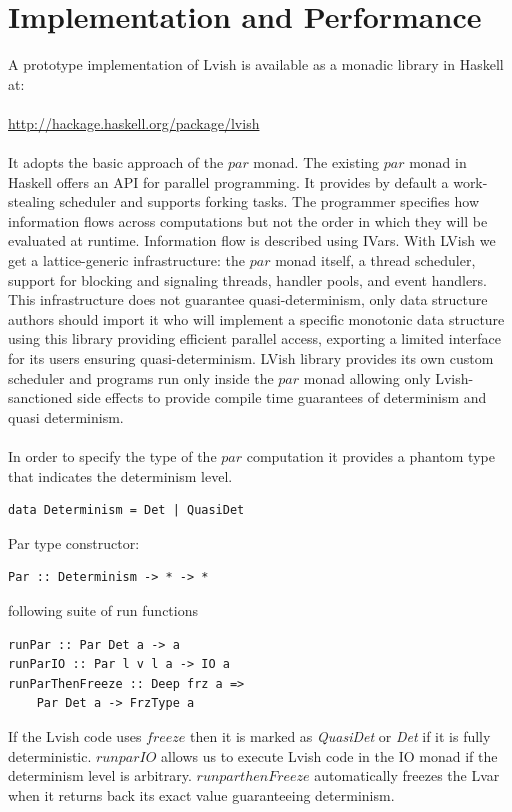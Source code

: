 \documentclass[twocolumn]{article}
\begin{document}
\section{Implementation and Performance}
A prototype implementation of Lvish is available as a monadic library in Haskell at:\\ \\
\url{http://hackage.haskell.org/package/lvish}\\ \\
It adopts the basic approach of the $par$ monad. The existing $par$ monad\cite{simon} in Haskell offers an API for parallel programming. It provides by default a work-stealing scheduler and supports forking tasks. The programmer specifies how information flows across computations but not the order in which they will be evaluated at runtime. Information flow is described using IVars. With
LVish we get a lattice-generic infrastructure: the $par$ monad itself, a thread scheduler, support for blocking and signaling threads, handler pools, and event handlers. This infrastructure does not guarantee quasi-determinism, only data structure
authors should import it who will implement a specific monotonic data structure using this library providing efficient parallel access, exporting a limited interface for its users ensuring quasi-determinism. LVish library provides its own custom scheduler and programs run only inside the $par$ monad allowing only Lvish-sanctioned side effects to provide compile time guarantees of
determinism and quasi determinism.\\ \\
In order to specify the type of the $par$ computation it provides a phantom type that indicates the determinism level.
\begin{verbatim}
data Determinism = Det | QuasiDet
\end{verbatim}
Par type constructor:
\begin{verbatim}
Par :: Determinism -> * -> *
\end{verbatim}
following suite of run functions
\begin{verbatim}
runPar :: Par Det a -> a
runParIO :: Par l v l a -> IO a
runParThenFreeze :: Deep frz a =>
	Par Det a -> FrzType a
\end{verbatim}
If the Lvish code uses $freeze$ then it is marked as \emph{QuasiDet} or \emph{Det} if it is fully deterministic. $runparIO$ allows us to execute Lvish code in the IO monad if the determinism level is arbitrary. $runparthenFreeze$ automatically freezes the Lvar when it returns back its exact value guaranteeing determinism.\\ \\
\end{document}
